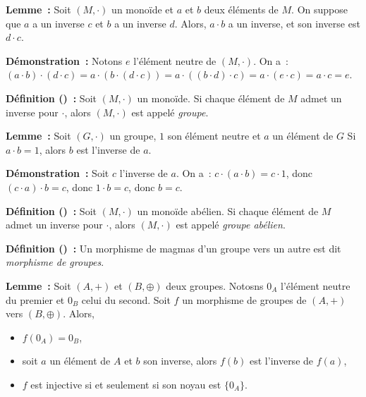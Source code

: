 \noindent\textbf{Lemme :} Soit $(M,\cdot)$ un monoïde et $a$ et $b$ deux éléments de $M$.
    On suppose que $a$ a un inverse $c$ et $b$ a un inverse $d$. 
    Alors, $a \cdot b$ a un inverse, et son inverse est $d \cdot c$.

\medskip

\noindent\textbf{Démonstration :} 
    Notons $e$ l'élément neutre de $(M, \cdot)$.
    On a : $(a \cdot b) \cdot (d \cdot c) = a \cdot (b \cdot (d \cdot c)) = a \cdot ((b \cdot d) \cdot c) = a \cdot (e \cdot c) = a \cdot c = e$.

    \done

\medskip

\noindent\textbf{Définition () :} Soit $(M,\cdot)$ un monoïde. 
    Si chaque élément de $M$ admet un inverse pour $\cdot$, alors $(M,\cdot)$ est appelé \textit{groupe}.

\medskip

\noindent\textbf{Lemme :} Soit $(G, \cdot)$ un groupe, $1$ son élément neutre et $a$ un élément de $G$
    Si $a \cdot b = 1$, alors $b$ est l'inverse de $a$.

\medskip

\noindent\textbf{Démonstration :}
    Soit $c$ l'inverse de $a$.
    On a : $c \cdot (a \cdot b) = c \cdot 1$, donc $(c \cdot a) \cdot b = c$, donc $1 \cdot b = c$, donc $b = c$.

    \done

\medskip

\noindent\textbf{Définition () :} Soit $(M,\cdot)$ un monoïde abélien. 
    Si chaque élément de $M$ admet un inverse pour $\cdot$, alors $(M,\cdot)$ est appelé \textit{groupe abélien}.

\medskip

\noindent\textbf{Définition () :} Un morphisme de magmas d'un groupe vers un autre est dit \textit{morphisme de groupes}.

\medskip

\noindent\textbf{Lemme :} Soit $(A, +)$ et $(B, \oplus)$ deux groupes. 
    Notosns $0_A$ l'élément neutre du premier et $0_B$ celui du second. 
    Soit $f$ un morphisme de groupes de $(A, +)$ vers $(B, \oplus)$.
    Alors, 
    \begin{itemize}[nosep]
        \item $f(0_A) = 0_B$,
        \item soit $a$ un élément de $A$ et $b$ son inverse, alors $f(b)$ est l'inverse de $f(a)$, 
        \item $f$ est injective si et seulement si son noyau est $\lbrace 0_A \rbrace$.
    \end{itemize}

